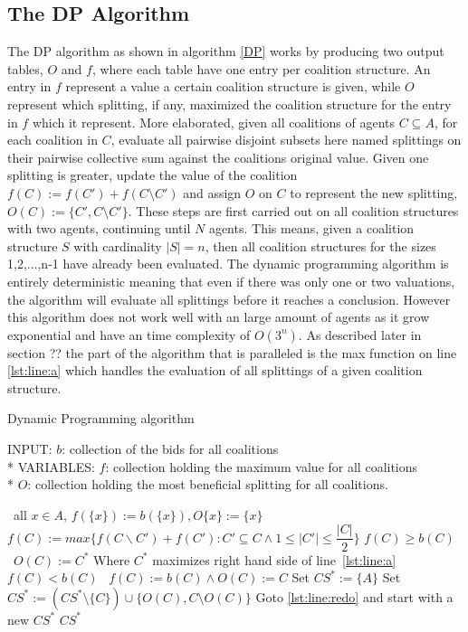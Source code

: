 \documentclass{aamas2012}
\begin{document}
\subsection{The {\secit DP} Algorithm} %


The DP algorithm as shown in algorithm \ref{DP} works by producing two output tables, $O$ and $f$, 
where each table have one entry per coalition structure. 
An entry in $f$ represent a value a certain coalition structure is given, 
while $O$ represent which splitting, if any, maximized the coalition structure for the entry in $f$ which it represent.
More elaborated, given all coalitions of agents $C\subseteq A$, for each coalition in $C$, evaluate all
pairwise disjoint subsets here named splittings on their pairwise collective sum against the coalitions
original value. Given one splitting is greater, update the value of the coalition $f(C) := f(C') + f(C\setminus C')$
and assign $O$ on $C$ to represent the new splitting, $O(C) := \{C',C\setminus C'\}$. These steps are first carried out
on all coalition structures with two agents, continuing until $N$ agents. 
This means, given a coalition structure $S$ with cardinality $|S| = n$, then all coalition structures
for the sizes 1,2,...,n-1 have already been evaluated. The dynamic programming algorithm is entirely deterministic meaning
that even if there was only one or two valuations, the algorithm will evaluate all splittings before it reaches a conclusion.
However this algorithm does not work well with an large amount of agents as it grow exponential and have an time complexity of $O(3^n)$.
As described later in section ?? the part of the algorithm that is paralleled is the max function on line \ref{lst:line:a}
which handles the evaluation of all splittings of a given coalition structure.

\begin{algorithm}
\caption{Dynamic Programming algorithm \label{DP}}
INPUT: $b$: collection of the bids for all coalitions\\*
VARIABLES: $f$: collection holding the maximum value for all coalitions\\*
$O$: collection holding the most beneficial splitting for all coalitions.
\begin{algorithmic}[1]
\STATE\algorithmicfor\ all $x \in A$, \algorithmicdo  $f(\{x\}):= b(\{x\}),O\{x\}:= \{x\}$ \algorithmicendfor
{}
\STATE $f(C) := max\{f(C\backslash C')+f(C'):C'\subseteq C \wedge 1 \leq \vert C' \vert \leq \dfrac{\vert C \vert}{2}\}$ \label{lst:line:a}
\STATE\algorithmicif $f(C) \geq b(C)$ \algorithmicthen\ $O(C) := C^{*}$ \hfill Where $C^{*}$ maximizes right hand side of line~\ref{lst:line:a} \algorithmicendif
\STATE\algorithmicif $f(C) < b(C)$ \algorithmicthen\ $f(C) := b(C)\wedge O(C) := C$ \algorithmicendif
\ENDFOR
\ENDFOR
\STATE Set $CS^* := \{A\}$
 \label{lst:line:redo}
\STATE Set $CS^* := (CS^*\setminus \{C\})\cup \{O(C),C\setminus O(C)\}$ 
\STATE Goto \ref{lst:line:redo} and start with a new $CS^*$
\ENDIF
\ENDFOR
\RETURN $CS^*$
\end{algorithmic}
\end{algorithm}
\end{document}

